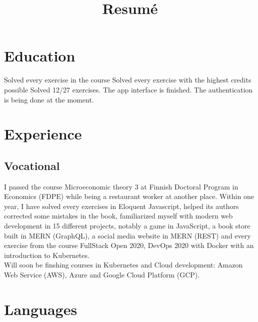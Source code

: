 \documentclass[11pt,a4paper,sans]{moderncv}
\title{Resumé}
\begin{document}
  \makecvtitle

  \section{Education}
  {}
  {Solved every exercise in the course}
  {Solved every exercise with the highest credits possible}
  {Solved 12/27 exercises. The app interface is finished. The authentication is being done at the moment.}

  \section{Experience}
  \subsection{Vocational}
  {}
  {I passed the course Microeconomic theory 3 at Finnish Doctoral Program in Economics (FDPE)
  while being a restaurant worker at another place.}
  {Within one year, I have solved every exercises in Eloquent Javascript, helped its authors
  corrected some mistakes in the book, familiarized myself with modern web
  development in 15 different projects, notably a game in JavaScript,
  a book store built in MERN (GraphQL), a social media website in MERN (REST)
  and every exercise from the course FullStack Open 2020, DevOps 2020 with Docker
  with an introduction to Kubernetes.
  \\
  Will soon be finshing courses in Kubernetes and Cloud
  development: Amazon Web Service (AWS), Azure and Google Cloud Platform (GCP).}

  \section{Languages}
\end{document}

